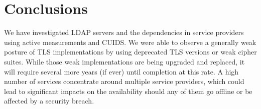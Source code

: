 




\section{Conclusions}
\iffalse
We have investigated \gls{LDAP} servers and the dependencies in service providers using active measurements and \gls{CUIDS}. We were able to observe a generally weak posture of TLS implementations by using deprecated TLS versions or weak cipher suites. While those weak implementations are being upgraded and replaced, it will require several more years (if ever) until completion at this rate. A high number of services concentrate around multiple service providers, which could lead to significant impacts on the availability should any of them go offline or be affected by a security breach.

